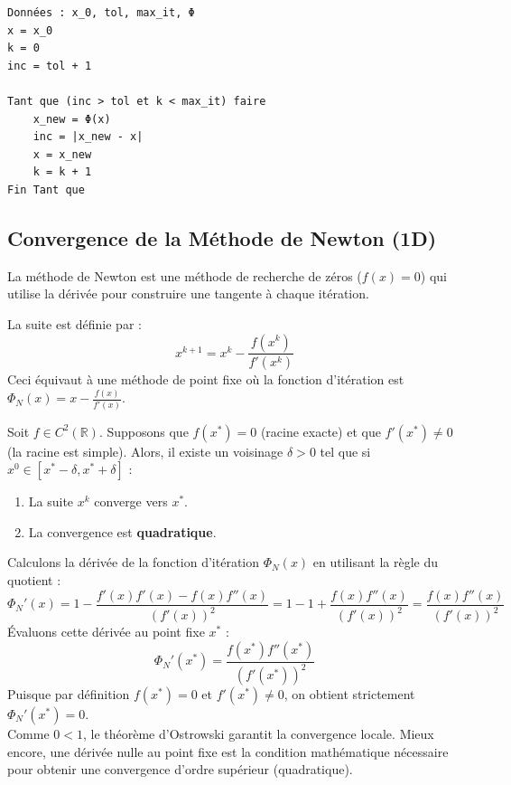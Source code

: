 \begin{algorithme}
\begin{verbatim}
Données : x_0, tol, max_it, Φ
x = x_0
k = 0
inc = tol + 1

Tant que (inc > tol et k < max_it) faire
    x_new = Φ(x)
    inc = |x_new - x|
    x = x_new
    k = k + 1
Fin Tant que
\end{verbatim}
\end{algorithme}

\subsection{Convergence de la Méthode de Newton (1D)}

La méthode de Newton est une méthode de recherche de zéros ($f(x) = 0$) qui utilise la dérivée pour construire une tangente à chaque itération.

\begin{definition}
La suite est définie par :
$$x^{k+1} = x^k - \frac{f(x^k)}{f'(x^k)}$$
Ceci équivaut à une méthode de point fixe où la fonction d'itération est $\Phi_N(x) = x - \frac{f(x)}{f'(x)}$.
\end{definition}

\begin{theoreme}
Soit $f \in C^2(\mathbb{R})$. Supposons que $f(x^*) = 0$ (racine exacte) et que $f'(x^*) \neq 0$ (la racine est simple). 
Alors, il existe un voisinage $\delta > 0$ tel que si $x^0 \in [x^* - \delta, x^* + \delta]$ :
\begin{enumerate}
    \item La suite $x^k$ converge vers $x^*$.
    \item La convergence est \textbf{quadratique}.
\end{enumerate}
\end{theoreme}

\begin{explication}
Calculons la dérivée de la fonction d'itération $\Phi_N(x)$ en utilisant la règle du quotient :
$$\Phi_N'(x) = 1 - \frac{f'(x)f'(x) - f(x)f''(x)}{(f'(x))^2} = 1 - 1 + \frac{f(x)f''(x)}{(f'(x))^2} = \frac{f(x)f''(x)}{(f'(x))^2}$$
Évaluons cette dérivée au point fixe $x^*$ :
$$\Phi_N'(x^*) = \frac{f(x^*)f''(x^*)}{(f'(x^*))^2}$$
Puisque par définition $f(x^*) = 0$ et $f'(x^*) \neq 0$, on obtient strictement $\Phi_N'(x^*) = 0$. \\
Comme $0 < 1$, le théorème d'Ostrowski garantit la convergence locale. Mieux encore, une dérivée nulle au point fixe est la condition mathématique nécessaire pour obtenir une convergence d'ordre supérieur (quadratique).
\end{explication}

